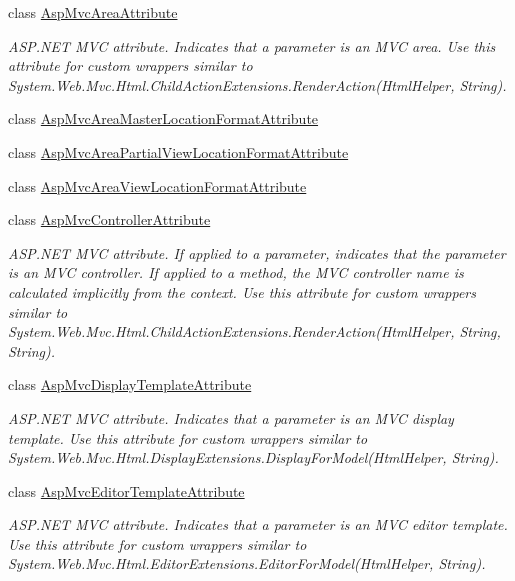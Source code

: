 \begin{DoxyCompactItemize}
class \mbox{\hyperlink{class_r_f_storage_1_1_asp_mvc_area_attribute}{Asp\+Mvc\+Area\+Attribute}}
\begin{DoxyCompactList}\small\item\em A\+S\+P.\+N\+ET M\+VC attribute. Indicates that a parameter is an M\+VC area. Use this attribute for custom wrappers similar to {\ttfamily System.\+Web.\+Mvc.\+Html.\+Child\+Action\+Extensions.\+Render\+Action(\+Html\+Helper, String)}. \end{DoxyCompactList}\item 
class \mbox{\hyperlink{class_r_f_storage_1_1_asp_mvc_area_master_location_format_attribute}{Asp\+Mvc\+Area\+Master\+Location\+Format\+Attribute}}
\item 
class \mbox{\hyperlink{class_r_f_storage_1_1_asp_mvc_area_partial_view_location_format_attribute}{Asp\+Mvc\+Area\+Partial\+View\+Location\+Format\+Attribute}}
\item 
class \mbox{\hyperlink{class_r_f_storage_1_1_asp_mvc_area_view_location_format_attribute}{Asp\+Mvc\+Area\+View\+Location\+Format\+Attribute}}
\item 
class \mbox{\hyperlink{class_r_f_storage_1_1_asp_mvc_controller_attribute}{Asp\+Mvc\+Controller\+Attribute}}
\begin{DoxyCompactList}\small\item\em A\+S\+P.\+N\+ET M\+VC attribute. If applied to a parameter, indicates that the parameter is an M\+VC controller. If applied to a method, the M\+VC controller name is calculated implicitly from the context. Use this attribute for custom wrappers similar to {\ttfamily System.\+Web.\+Mvc.\+Html.\+Child\+Action\+Extensions.\+Render\+Action(\+Html\+Helper, String, String)}. \end{DoxyCompactList}\item 
class \mbox{\hyperlink{class_r_f_storage_1_1_asp_mvc_display_template_attribute}{Asp\+Mvc\+Display\+Template\+Attribute}}
\begin{DoxyCompactList}\small\item\em A\+S\+P.\+N\+ET M\+VC attribute. Indicates that a parameter is an M\+VC display template. Use this attribute for custom wrappers similar to {\ttfamily System.\+Web.\+Mvc.\+Html.\+Display\+Extensions.\+Display\+For\+Model(\+Html\+Helper, String)}. \end{DoxyCompactList}\item 
class \mbox{\hyperlink{class_r_f_storage_1_1_asp_mvc_editor_template_attribute}{Asp\+Mvc\+Editor\+Template\+Attribute}}
\begin{DoxyCompactList}\small\item\em A\+S\+P.\+N\+ET M\+VC attribute. Indicates that a parameter is an M\+VC editor template. Use this attribute for custom wrappers similar to {\ttfamily System.\+Web.\+Mvc.\+Html.\+Editor\+Extensions.\+Editor\+For\+Model(\+Html\+Helper, String)}. \end{DoxyCompactList}\item 

\end{DoxyCompactItemize}
